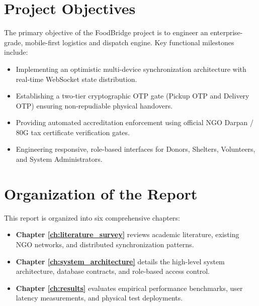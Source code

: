 \section{Project Objectives}
The primary objective of the FoodBridge project is to engineer an enterprise-grade, mobile-first logistics and dispatch engine. Key functional milestones include:
\begin{itemize}
    \item Implementing an optimistic multi-device synchronization architecture with real-time WebSocket state distribution.
    \item Establishing a two-tier cryptographic OTP gate (Pickup OTP and Delivery OTP) ensuring non-repudiable physical handovers.
    \item Providing automated accreditation enforcement using official NGO Darpan / 80G tax certificate verification gates.
    \item Engineering responsive, role-based interfaces for Donors, Shelters, Volunteers, and System Administrators.
\end{itemize}

\section{Organization of the Report}
This report is organized into six comprehensive chapters:
\begin{itemize}
    \item \textbf{Chapter \ref{ch:literature_survey}} reviews academic literature, existing NGO networks, and distributed synchronization patterns.
    \item \textbf{Chapter \ref{ch:system_architecture}} details the high-level system architecture, database contracts, and role-based access control.
    \item \textbf{Chapter \ref{ch:results}} evaluates empirical performance benchmarks, user latency measurements, and physical test deployments.
\end{itemize}
